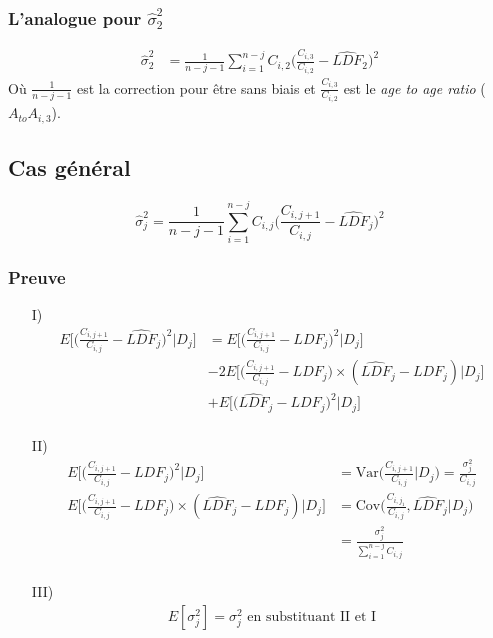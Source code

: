 \documentclass[11pt,french]{report}
\begin{document}
\subsubsection*{L'analogue pour $\widehat{\sigma}_2^2$}
\begin{align*}
\widehat{\sigma}_2^2 &= \frac{1}{n-j-1} \sum_{i=1}^{n-j} C_{i,2} \Bigg( \frac{C_{i,3}}{C_{i,2}} - \widehat{LDF}_2\Bigg)^2
\end{align*}
Où $\frac{1}{n-j-1}$ est la correction pour être sans biais et $\frac{C_{i,3}}{C_{i,2}}$ est le \emph{age to age ratio} ($A_{to}A_{i,3}$).

\subsection*{Cas général}
\begin{equation}
\label{eq:est:sigm}
\widehat{\sigma}_j^2 = \frac{1}{n-j-1} \sum_{i=1}^{n-j} C_{i,j} \Bigg( \frac{C_{i,j+1}}{C_{i,j}} - \widehat{LDF}_j\Bigg)^2
\end{equation}

\subsubsection*{Preuve}
\begin{itemize}
\item[I)]\begin{align*}
E \Bigg[ \Bigg( \frac{C_{i,j+1}}{C_{i,j}} - \widehat{LDF}_j \Bigg)^2 \bigg| D_j \Bigg] &= E \Bigg[ \Bigg( \frac{C_{i,j+1}}{C_{i,j}} - LDF_j\Bigg)^2 \Bigg| D_j \Bigg] \\ 
&- 2 E \Bigg[ \Bigg( \frac{C_{i,j+1}}{C_{i,j}} - LDF_j\Bigg) \times (\widehat{LDF}_j - LDF_j) \Bigg| D_j \Bigg] \\
&+ E \Bigg[ \Bigg( \widehat{LDF}_j- LDF_j \Bigg)^2 \Bigg| D_j \Bigg] \\
\end{align*}
\item[II)]\begin{align*}
E \Bigg[ \Bigg( \frac{C_{i,j+1}}{C_{i,j}} - LDF_j\Bigg)^2 \Bigg| D_j \Bigg] &= \text{Var}\Bigg( \frac{C_{i,j+1}}{C_{i,j}} \Bigg|D_j\Bigg) = \frac{\sigma_j^2}{C_{i,j}} \\
E \Bigg[ \Bigg( \frac{C_{i,j+1}}{C_{i,j}} - LDF_j\Bigg) \times (\widehat{LDF}_j - LDF_j) \Bigg| D_j \Bigg]  &= \text{Cov} \Bigg( \frac{C_{i,j_1}}{C_{i,j}}, \widehat{LDF}_j \Bigg|D_j \Bigg) \\
&= \frac{\sigma_j^2}{\sum_{i=1}^{n-j} C_{i,j}} \\
\end{align*}
\item[III)] \begin{align*}
E[\sigma_j^2] = \sigma_j^2 \text{ en substituant II et I}
\end{align*}
\end{itemize}
\bigskip
\end{document}
